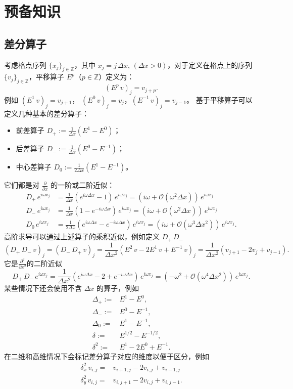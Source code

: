 \section{预备知识}

\subsection*{差分算子}

考虑格点序列 $\{x_j\}_{j \in \mathbb{Z}}$，其中 $x_j = j \, \Delta x,\,(\Delta x > 0)$，对于定义在格点上的序列 $\{v_j\}_{j \in \mathbb{Z}}$，平移算子 $E^p$（$p \in \mathbb{Z}$）定义为：
\[
    (E^p\,v)_j = v_{j+p}.
\]
例如 $(E^{1}\,v)_j = v_{j+1}$， $(E^{0}\,v)_j = v_j$，$(E^{-1}\,v)_j = v_{j-1}$。
基于平移算子可以定义几种基本的差分算子：
\begin{itemize}
    \item 前差算子 $D_+ := \frac1{\Delta x}(E^1 - E^{0})$；
    \item 后差算子 $D_- := \frac1{\Delta x}(E^0 - E^{-1})$；
    \item 中心差算子 $D_0 := \frac1{2\Delta x}(E^1 - E^{-1})$。
\end{itemize}
它们都是对 $\frac{\partial}{\partial x}$ 的一阶或二阶近似：
\begin{align*}
    D_+\,e^{i \omega x_j} & = \frac1{\Delta x} (e^{i \omega \Delta x} -  1)\, e^{i \omega x_j} = (i \omega + \mathcal{O}(\omega^2 \Delta x)) \,e^{i \omega x_j}                        \\
    D_-\,e^{i \omega x_j} & = \frac1{\Delta x} (1 - e^{-i \omega \Delta x})\, e^{i \omega x_j} = (i \omega + \mathcal{O}(\omega^2 \Delta x)) \,e^{i \omega x_j}                        \\
    D_0\,e^{i \omega x_j} & = \frac1{2\Delta x} (e^{i \omega \Delta x} - e^{-i \omega \Delta x})\, e^{i \omega x_j} = (i \omega + \mathcal{O}(\omega^3 \Delta x^2))\, e^{i \omega x_j}.
\end{align*}
高阶求导可以通过上述算子的乘积近似，例如定义 $D_+\,D_-$
\[
    (D_+\,D_- \,v)_j = (D_-\,D_+ \,v)_j =
    \frac{1}{\Delta x^2}(E^2\,v - 2E^1\,v + E^{-1}\,v)_j
    = \frac{1}{\Delta x^2}(v_{j+1} - 2v_{j} + v_{j-1}).
\]
它是$\frac{\partial^2}{\partial x^2}$的二阶近似
\[
    D_+\,D_- \,e^{i \omega x_j}
    = \frac{1}{\Delta x^2}(e^{i \omega \Delta x}-2+e^{-i \omega \Delta x})\,e^{i \omega x_j}
    = (-\omega^2 + \mathcal{O}(\omega^4 \Delta x^2))\,e^{i \omega x_j}.
\]
某些情况下还会使用不含 $\Delta x$ 的算子，例如
\begin{align*}
    \Delta_+ :={} & E^1 - E^{0},           \\
    \Delta_- :={} & E^0 - E^{-1},          \\
    \Delta_0 :={} & E^1 - E^{-1},          \\
    \delta :={}   & E^{1/2} - E^{-1/2},    \\
    \delta^2 :={} & E^1  - 2 E^0 + E^{-1}.
\end{align*}
在二维和高维情况下会标记差分算子对应的维度以便于区分，例如
\begin{align*}
    \delta_x^2 \, v_{i,j} ={} & v_{i+1,j} - 2 v_{i,j} + v_{i-1,j} \\
    \delta_y^2 \, v_{i,j} ={} & v_{i,j+1} - 2 v_{i,j} + v_{i,j-1}.
\end{align*}

